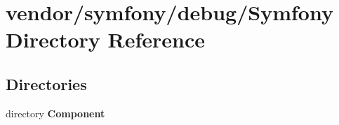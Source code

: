 \section{vendor/symfony/debug/\+Symfony Directory Reference}
\label{dir_1d5171c44fa54392e5e12bca964a50a4}
\subsection*{Directories}
\begin{DoxyCompactItemize}
\item 
directory {\bf Component}
\end{DoxyCompactItemize}
